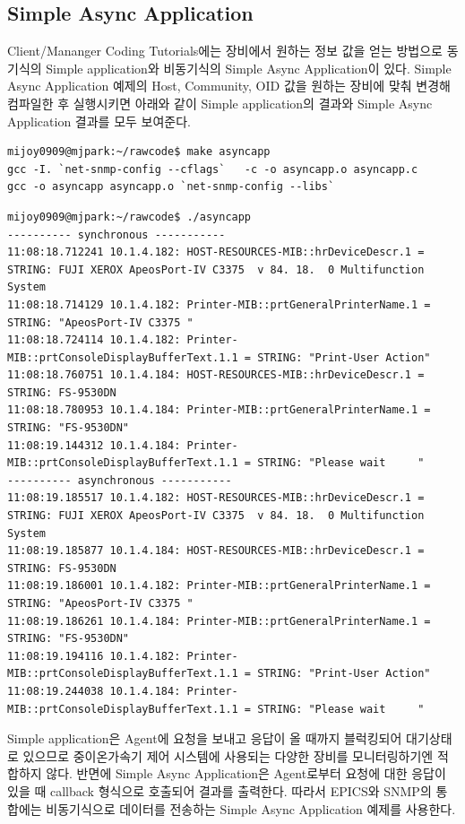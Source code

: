 \documentclass[11pt
  , a4paper
  , article
  , oneside
]{memoir}
\begin{document}
\subsection{Simple Async Application}
Client/Mananger Coding Tutorials에는 장비에서 원하는 정보 값을 얻는 방법으로 동기식의 Simple application와 비동기식의 Simple Async Application이 있다. 
Simple Async Application 예제의 Host, Community, OID 값을 원하는 장비에 맞춰 변경해 컴파일한 후 실행시키면 아래와 같이 Simple application의 결과와 Simple Async Application 결과를 모두 보여준다. 

\begin{lstlisting}[style=termstyle]
mijoy0909@mjpark:~/rawcode$ make asyncapp
gcc -I. `net-snmp-config --cflags`   -c -o asyncapp.o asyncapp.c
gcc -o asyncapp asyncapp.o `net-snmp-config --libs`
\end{lstlisting}

\begin{lstlisting}[style=termstylenumber]
mijoy0909@mjpark:~/rawcode$ ./asyncapp 
---------- synchronous -----------
11:08:18.712241 10.1.4.182: HOST-RESOURCES-MIB::hrDeviceDescr.1 = STRING: FUJI XEROX ApeosPort-IV C3375  v 84. 18.  0 Multifunction System
11:08:18.714129 10.1.4.182: Printer-MIB::prtGeneralPrinterName.1 = STRING: "ApeosPort-IV C3375 "
11:08:18.724114 10.1.4.182: Printer-MIB::prtConsoleDisplayBufferText.1.1 = STRING: "Print-User Action"
11:08:18.760751 10.1.4.184: HOST-RESOURCES-MIB::hrDeviceDescr.1 = STRING: FS-9530DN
11:08:18.780953 10.1.4.184: Printer-MIB::prtGeneralPrinterName.1 = STRING: "FS-9530DN"
11:08:19.144312 10.1.4.184: Printer-MIB::prtConsoleDisplayBufferText.1.1 = STRING: "Please wait     "
---------- asynchronous -----------
11:08:19.185517 10.1.4.182: HOST-RESOURCES-MIB::hrDeviceDescr.1 = STRING: FUJI XEROX ApeosPort-IV C3375  v 84. 18.  0 Multifunction System
11:08:19.185877 10.1.4.184: HOST-RESOURCES-MIB::hrDeviceDescr.1 = STRING: FS-9530DN
11:08:19.186001 10.1.4.182: Printer-MIB::prtGeneralPrinterName.1 = STRING: "ApeosPort-IV C3375 "
11:08:19.186261 10.1.4.184: Printer-MIB::prtGeneralPrinterName.1 = STRING: "FS-9530DN"
11:08:19.194116 10.1.4.182: Printer-MIB::prtConsoleDisplayBufferText.1.1 = STRING: "Print-User Action"
11:08:19.244038 10.1.4.184: Printer-MIB::prtConsoleDisplayBufferText.1.1 = STRING: "Please wait     "
\end{lstlisting}

Simple application은 Agent에 요청을 보내고 응답이 올 때까지 블럭킹되어 대기상태로 있으므로 중이온가속기 제어 시스템에 사용되는 다양한 장비를 모니터링하기엔 적합하지 않다. 반면에 Simple Async Application은 Agent로부터 요청에 대한 응답이 있을 때 callback 형식으로 호출되어 결과를 출력한다. 따라서 EPICS와 SNMP의 통합에는 비동기식으로 데이터를 전송하는 Simple Async Application 예제를 사용한다.
\end{document}
